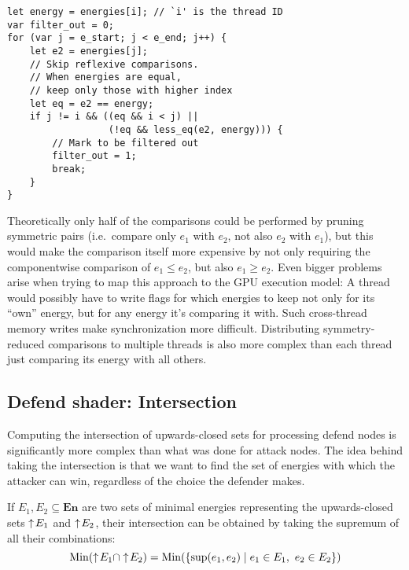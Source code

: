 \begin{lstlisting}[language=WGSL,float,
    caption={WGSL Shader Code for minimizing energies.
        \texttt{i} is the thread ID
        and determines the energy that this thread processes.
        It is compared against energies at index \texttt{j},
        which loops through the range of energies to minimize,
        denoted by \texttt{e\_start} and \texttt{e\_end}.
        The function \texttt{less\_eq} is shown in Listing~\ref{lst:less_eq}.},
    label=lst:minimize]
let energy = energies[i]; // `i' is the thread ID
var filter_out = 0;
for (var j = e_start; j < e_end; j++) {
    let e2 = energies[j];
    // Skip reflexive comparisons.
    // When energies are equal,
    // keep only those with higher index
    let eq = e2 == energy;
    if j != i && ((eq && i < j) ||
                  (!eq && less_eq(e2, energy))) {
        // Mark to be filtered out
        filter_out = 1;
        break;
    }
}
\end{lstlisting}

Theoretically only half of the comparisons could be performed by pruning symmetric
pairs (i.e.\ compare only $e_1$ with $e_2$, not also $e_2$ with $e_1$),
but this would make the comparison itself more expensive by not only requiring
the componentwise comparison of $e_1 \leq e_2$, but also $e_1 \geq e_2$.
Even bigger problems arise when trying to map this approach to the GPU
execution model:
A thread would possibly have to write flags for which energies to keep not only
for its \enquote{own} energy,
but for any energy it's comparing it with.
Such cross-thread memory writes make synchronization more difficult.
Distributing symmetry-reduced comparisons to multiple threads is also
more complex than each thread just comparing its energy with all others.


\subsection{Defend shader: Intersection}\label{subsec:defend_shader}

Computing the intersection of upwards-closed sets for processing defend nodes
is significantly more complex than what was done for attack nodes.
The idea behind taking the intersection is that we want to find the set of
energies with which the attacker can win,
regardless of the choice the defender makes.

If $E_1, E_2 \subseteq \mathbf{En}$ are two sets of minimal energies
representing the upwards-closed sets $\uparrow\! E_1$ and $\uparrow\! E_2$,
their intersection can be obtained by taking the supremum of all their combinations:
\begin{equation*}
    \mathrm{Min} (\uparrow\! E_1 \cap \uparrow\! E_2 ) =
    \mathrm{Min} (\{ \sup(e_1, e_2) \mid e_1 \in E_1,\ e_2 \in E_2 \})
\end{equation*}

